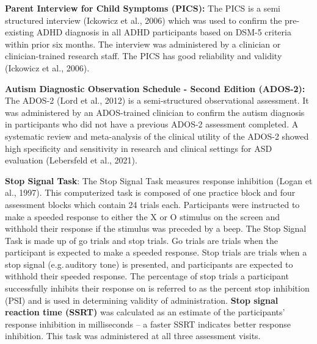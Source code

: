 \documentclass[
  letterpaper,
]{ut-thesis}
\begin{document}
\textbf{Parent Interview for Child Symptoms (PICS):} The PICS is a semi
structured interview (Ickowicz et al., 2006) which was used to confirm
the pre-existing ADHD diagnosis in all ADHD participants based on DSM-5
criteria within prior six months. The interview was administered by a
clinician or clinician-trained research staff. The PICS has good
reliability and validity (Ickowicz et al., 2006).

\textbf{Autism Diagnostic Observation Schedule - Second Edition
(ADOS-2):} The ADOS-2 (Lord et al., 2012) is a semi-structured
observational assessment. It was administered by an ADOS-trained
clinician to confirm the autism diagnosis in participants who did not
have a previous ADOS-2 assessment completed. A systematic review and
meta-analysis of the clinical utility of the ADOS-2 showed high
specificity and sensitivity in research and clinical settings for ASD
evaluation (Lebersfeld et al., 2021).

\textbf{Stop Signal Task}: The Stop Signal Task measures response
inhibition (Logan et al., 1997). This computerized task is composed of
one practice block and four assessment blocks which contain 24 trials
each. Participants were instructed to make a speeded response to either
the X or O stimulus on the screen and withhold their response if the
stimulus was preceded by a beep. The Stop Signal Task is made up of go
trials and stop trials. Go trials are trials when the participant is
expected to make a speeded response. Stop trials are trials when a stop
signal (e.g.\,auditory tone) is presented, and participants are expected
to withhold their speeded response. The percentage of stop trials a
participant successfully inhibits their response on is referred to as
the percent stop inhibition (PSI) and is used in determining validity of
administration. \textbf{Stop signal reaction time (SSRT)} was calculated
as an estimate of the participants' response inhibition in milliseconds
-- a faster SSRT indicates better response inhibition. This task was
administered at all three assessment visits.
\end{document}
